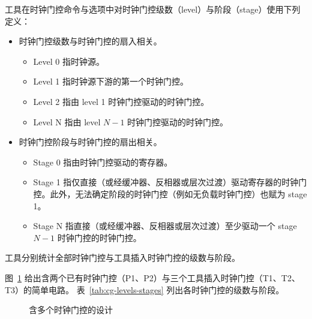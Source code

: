 工具在时钟门控命令与选项中对时钟门控级数（level）与阶段（stage）使用下列定义：
\begin{itemize}
  \item 时钟门控级数与时钟门控的扇入相关。
  \begin{itemize}
    \item Level 0 指时钟源。
    \item Level 1 指时钟源下游的第一个时钟门控。
    \item Level 2 指由 level 1 时钟门控驱动的时钟门控。
    \item Level N 指由 level \(N-1\) 时钟门控驱动的时钟门控。
  \end{itemize}
  \item 时钟门控阶段与时钟门控的扇出相关。
  \begin{itemize}
    \item Stage 0 指由时钟门控驱动的寄存器。
    \item Stage 1 指仅直接（或经缓冲器、反相器或层次过渡）驱动寄存器的时钟门控。此外，无法确定阶段的时钟门控（例如无负载时钟门控）也赋为 stage 1。
    \item Stage N 指直接（或经缓冲器、反相器或层次过渡）至少驱动一个 stage \(N-1\) 时钟门控的时钟门控。
  \end{itemize}
\end{itemize}

工具分别统计全部时钟门控与工具插入时钟门控的级数与阶段。

图~\ref{fig:cg-multi-cg} 给出含两个已有时钟门控（P1、P2）与三个工具插入时钟门控（T1、T2、T3）的简单电路。
表~\ref{tab:cg-levels-stages} 列出各时钟门控的级数与阶段。

\begin{figure}[htbp]
\centering
{}
\caption{含多个时钟门控的设计}
\label{fig:cg-multi-cg}
\end{figure}

